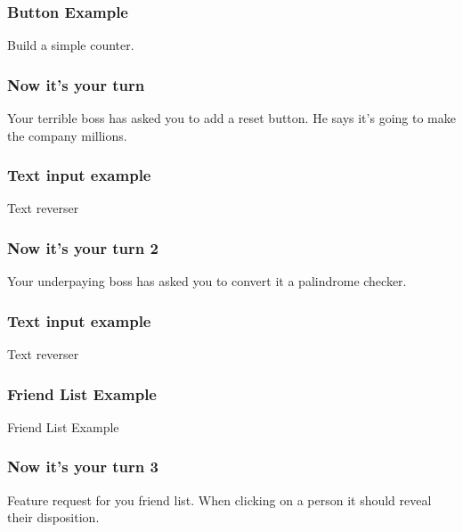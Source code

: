 \documentclass[aspectratio=1610]{beamer}
\begin{document}
\begin{frame}

\frametitle{Button Example}

\begin{center}
     \Huge Build a simple counter.
\end{center}

\end{frame}

\begin{frame}

\frametitle{Now it's your turn}

Your terrible boss has asked you to add a reset button.
He says it's going to make the company millions.

\end{frame}

\begin{frame}

\frametitle{Text input example}

\begin{center}
     \Huge Text reverser
\end{center}

\end{frame}

\begin{frame}

\frametitle{Now it's your turn 2}
Your underpaying boss has asked you to convert it a palindrome checker.
\end{frame}
\begin{frame}

\frametitle{Text input example}

\begin{center}
     \Huge Text reverser
\end{center}

\end{frame}

\begin{frame}

\frametitle{Friend List Example}

\begin{center}
     \Huge Friend List Example
\end{center}

\end{frame}

\begin{frame}

\frametitle{Now it's your turn 3}
    Feature request for you friend list.
    When clicking on a person it should reveal their disposition.
\end{frame}
\end{document}
